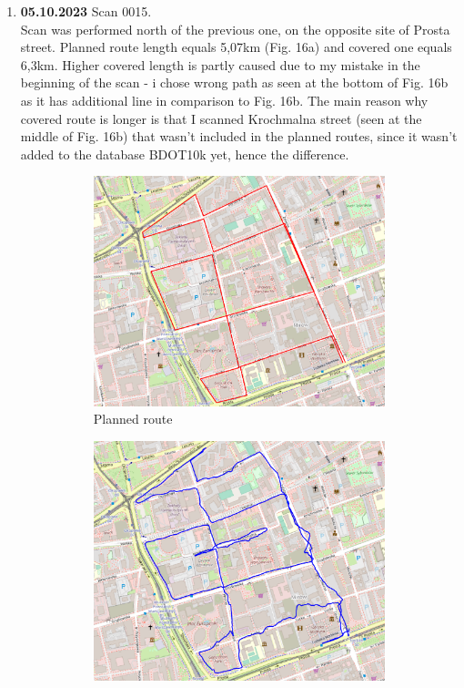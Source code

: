 \documentclass[a4paper,12pt]{article}
\begin{document}
\begin{enumerate}
	\item \textbf{05.10.2023} Scan 0015. \\
	Scan was performed north of the previous one, on the opposite site of Prosta street. Planned route length equals 5,07km (Fig. 16a) and covered one equals 6,3km. Higher covered length is partly caused due to my mistake in the beginning of the scan - i chose wrong path as seen at the bottom of Fig. 16b as it has additional line in comparison to Fig. 16b. The main reason why covered route is longer is that I scanned Krochmalna street (seen at the middle of Fig. 16b) that wasn't included in the planned routes, since it wasn't added to the database BDOT10k yet, hence the difference. 
	\begin{figure}[H]
		\centering
		\begin{subfigure}{.85\textwidth}
			\centering
			\includegraphics[width=1\linewidth]{route_p15}
			\caption{Planned route}
			\label{fig:a15}
		\end{subfigure}%
		\linebreak
		\begin{subfigure}{.85\textwidth}
			\centering
			\includegraphics[width=1\linewidth]{route_c15}

\end{subfigure}
\end{figure}
\end{enumerate}
\end{document}
